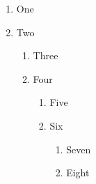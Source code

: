 \documentclass{article}
\begin{document}
\begin{enumerate}
  \item One
  \item Two
    \begin{enumerate}
      \item Three
      \item Four
        \begin{enumerate}
          \item Five
          \item Six
            \begin{enumerate}
              \item Seven
              \item Eight
            \end{enumerate}
        \end{enumerate}
    \end{enumerate}
\end{enumerate}
\end{document}
